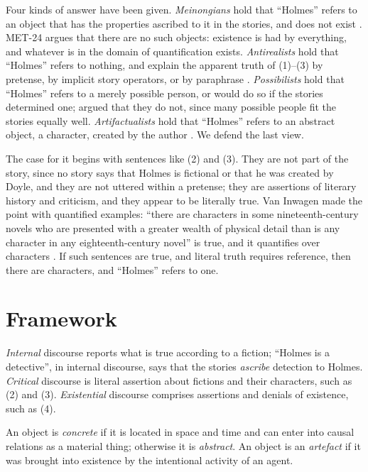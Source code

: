\documentclass{situationist-preprint}
\begin{document}
Four kinds of answer have been given. \emph{Meinongians} hold that \enquote{Holmes} refers to an object that has the properties ascribed to it in the stories, and does not exist \citep{Parsons1980}. MET-24 argues that there are no such objects: existence is had by everything, and whatever is in the domain of quantification exists. \emph{Antirealists} hold that \enquote{Holmes} refers to nothing, and explain the apparent truth of (1)--(3) by pretense, by implicit story operators, or by paraphrase \citep{Walton1990,Everett2013}. \emph{Possibilists} hold that \enquote{Holmes} refers to a merely possible person, or would do so if the stories determined one; \citet{Kripke1980} argued that they do not, since many possible people fit the stories equally well. \emph{Artifactualists} hold that \enquote{Holmes} refers to an abstract object, a character, created by the author \citep{vanInwagen1977,Kripke2013,Thomasson1999,Salmon1998,Schiffer1996}. We defend the last view.

The case for it begins with sentences like (2) and (3). They are not part of the story, since no story says that Holmes is fictional or that he was created by Doyle, and they are not uttered within a pretense; they are assertions of literary history and criticism, and they appear to be literally true. Van Inwagen made the point with quantified examples: \enquote{there are characters in some nineteenth-century novels who are presented with a greater wealth of physical detail than is any character in any eighteenth-century novel} is true, and it quantifies over characters \citep{vanInwagen1977}. If such sentences are true, and literal truth requires reference, then there are characters, and \enquote{Holmes} refers to one.

\section{Framework}

\begin{definition}\label{d:discourse}
\emph{Internal} discourse reports what is true according to a fiction; \enquote{Holmes is a detective}, in internal discourse, says that the stories \emph{ascribe} detection to Holmes. \emph{Critical} discourse is literal assertion about fictions and their characters, such as (2) and (3). \emph{Existential} discourse comprises assertions and denials of existence, such as (4).
\end{definition}

\begin{definition}\label{d:abstract}
An object is \emph{concrete} if it is located in space and time and can enter into causal relations as a material thing; otherwise it is \emph{abstract}. An object is an \emph{artefact} if it was brought into existence by the intentional activity of an agent.
\end{definition}
\end{document}

